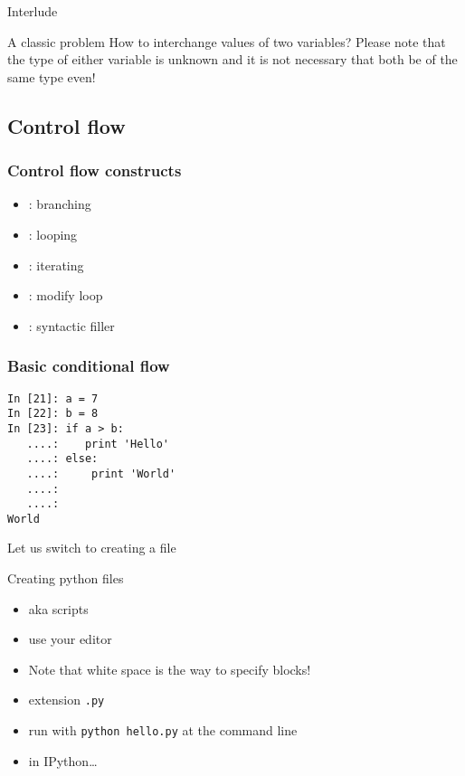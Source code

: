 \documentclass[14pt,compress]{beamer}
\newcounter{time}
\newcommand{\inctime}[1]{\addtocounter{time}{#1}{\tiny \thetime\ m}}
\newcommand{\typ}[1]{\texttt{#1}}
\newcommand{\kwrd}[1]{ \texttt{\textbf{\color{blue}{#1}}}  }
\begin{document}
\begin{frame}
  {Interlude}
  \begin{block}
    {A classic problem}
    How to interchange values of two variables? Please note that the type of either variable is unknown and it is not necessary that both be of the same type even!
  \end{block}
  \inctime{30}
\end{frame}


\subsection{Control flow}
\begin{frame}
  \frametitle{Control flow constructs}  
  \begin{itemize}
  \item \kwrd{if/elif/else}: branching
  \item \kwrd{while}: looping
  \item \kwrd{for}: iterating 
  \item \kwrd{break, continue}: modify loop 
  \item \kwrd{pass}: syntactic filler
  \end{itemize}
\end{frame}

\begin{frame}[fragile]
  \frametitle{Basic conditional flow}
  \begin{lstlisting}
In [21]: a = 7
In [22]: b = 8
In [23]: if a > b:
   ....:    print 'Hello'
   ....: else:
   ....:     print 'World'
   ....:
   ....:
World
  \end{lstlisting}
  Let us switch to creating a file
\end{frame}

\begin{frame}
  {Creating python files}
  \begin{itemize}
    \item aka scripts
    \item use your editor
    \item Note that white space is the way to specify blocks!
    \item extension \typ{.py}
    \item run with \texttt{python hello.py} at the command line
    \item in IPython\ldots
  \end{itemize}
\end{frame}
\end{document}
